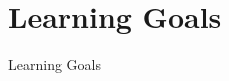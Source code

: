 \documentclass[nobackground,dvipsnames,table]{beamer}
\begin{document}
\section{Learning Goals}

\begin{frame}{} %
    \thispagestyle{empty}
    
    \huge
    Learning Goals
\end{frame}


\begin{frame}{} %
    \thispagestyle{empty}
    \centering
\end{frame}


\begin{frame}{} %
    \thispagestyle{empty}
    \centering
\end{frame}
\end{document}
